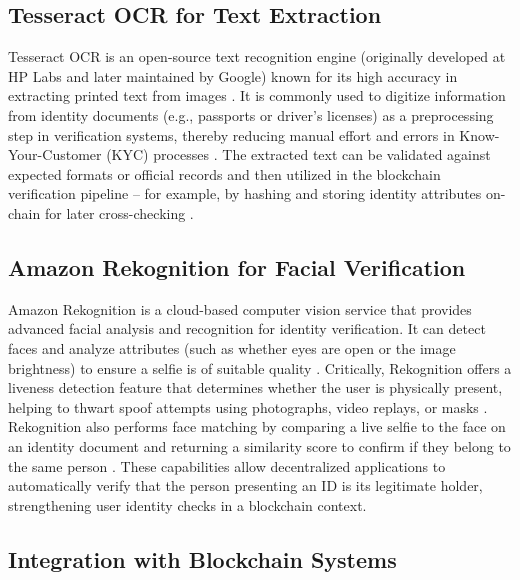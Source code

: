 \documentclass[a4paper,10pt]{report}
\begin{document}
\subsection{Tesseract OCR for Text Extraction}

Tesseract OCR is an open-source text recognition engine (originally developed at HP Labs and later maintained by Google) known for its high accuracy in extracting printed text from images \cite{smith2007tesseract}. It is commonly used to digitize information from identity documents (e.g., passports or driver’s licenses) as a preprocessing step in verification systems, thereby reducing manual effort and errors in Know-Your-Customer (KYC) processes \cite{atkar2025aiblockchain}. The extracted text can be validated against expected formats or official records and then utilized in the blockchain verification pipeline – for example, by hashing and storing identity attributes on-chain for later cross-checking \cite{atkar2025aiblockchain}.

\subsection{Amazon Rekognition for Facial Verification}

Amazon Rekognition is a cloud-based computer vision service that provides advanced facial analysis and recognition for identity verification. It can detect faces and analyze attributes (such as whether eyes are open or the image brightness) to ensure a selfie is of suitable quality \cite{aws2023rekognition}. Critically, Rekognition offers a liveness detection feature that determines whether the user is physically present, helping to thwart spoof attempts using photographs, video replays, or masks \cite{aws2023rekognition}. Rekognition also performs face matching by comparing a live selfie to the face on an identity document and returning a similarity score to confirm if they belong to the same person \cite{aws2023rekognition}. These capabilities allow decentralized applications to automatically verify that the person presenting an ID is its legitimate holder, strengthening user identity checks in a blockchain context.

\subsection{Integration with Blockchain Systems}
\end{document}
